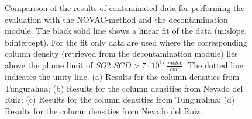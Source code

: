 \documentclass  [
  paper    = a4,
  BCOR     = 10mm,
  twoside,
  fontsize = 12pt,
  fleqn,
  toc      = bibnumbered,
  toc      = listofnumbered,
  numbers  = noendperiod,
  headings = normal,
  listof   = leveldown,
  version  = 3.03
]                                       {scrreprt}
\begin{document}
\begin{figure}[h!]
		\caption{Comparison of the results of contaminated data for performing the evaluation with the NOVAC-method and the decontamination module. The black solid line shows a linear fit of the data (m:slope, b:intercept). For the fit only data are used where the corresponding   column density (retrieved from the decontamination module) lies above the plume limit of $SO2\_SCD>7\cdot 10^{17}\,\frac{molec}{cm^2}$. The dotted line indicates the unity line. (a) Results for the   column densities from Tungurahua; (b) Results for the   column densities from Nevado del Ruiz; (c) Results for the   column densities from Tungurahua; (d) Results for the   column densities from Nevado del Ruiz.}
		\label{fig:diffNovac}
	\end{figure}
\begin{figure}[h!]		
\end{figure}
\end{document}
